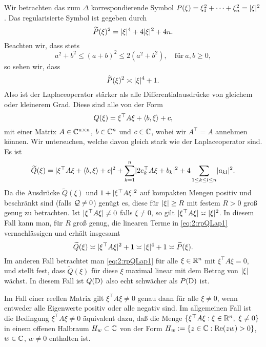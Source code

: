 \begin{exa}\label{exa:2:lap}
Wir betrachten das zum  $\Delta$
korrespondierende Symbol $P(\xi)=\xi_1^2+\dots+\xi_n^2=\lvert\xi\rvert^2$.
Das regularisierte Symbol ist gegeben durch
\begin{equation}
\widetilde{P}(\xi)^2=\lvert\xi\rvert^4+4\lvert\xi\rvert^2+4n.
\end{equation}
Beachten wir, dass stets
\begin{equation}\label{eq:2:sqrest}
a^2+b^2\leq(a+b)^2\leq2(a^2+b^2),\quad\text{für}~a,b\geq0,
\end{equation}
so sehen wir, dass
\begin{equation}
\widetilde{P}(\xi)^2\asymp\lvert\xi\rvert^4+1.
\end{equation}
Also ist der Laplaceoperator stärker als alle Differentialausdrücke von gleichem oder kleinerem Grad.
Diese sind alle von der Form
\begin{equation}
Q(\xi)=\xi^\top A\xi+\langle b,\xi\rangle+c,
\end{equation}
mit einer Matrix $A\in\mathbb C^{n\times n}$, $b\in\mathbb C^n$ und $c\in\mathbb C$,
wobei wir $A^\top=A$ annehmen können.
Wir untersuchen, welche davon gleich stark wie der Laplaceoperator sind.
Es ist
\begin{equation}\label{eq:2:rpQLap1}
\widetilde{Q}(\xi)=\lvert\xi^\top A\xi+\langle b,\xi\rangle+c\rvert^2+\sum_{k=1}^n\lvert2e^\top_kA\xi+b_k\rvert^2
+4\sum_{1\leq k\leq l\leq n}\lvert a_{kl}\rvert^2.
\end{equation}
Da die Ausdrücke $\widetilde{Q}(\xi)$ und $1+\lvert\xi^\top A\xi\rvert^2$
auf kompakten Mengen positiv und beschränkt sind (falls $\mathcal Q\neq0$) genügt es,
diese für $\lvert\xi\rvert\geq R$ mit festem $R>0$ groß genug zu betrachten.
Ist $\lvert\xi^\top A\xi\rvert\neq0$ falls $\xi\neq0$,
so gilt $\lvert\xi^\top A\xi\rvert\asymp\lvert\xi\rvert^2$.
In diesem Fall kann man, für $R$ groß genug,
die linearen Terme in \eqref{eq:2:rpQLap1} vernachlässigen
und erhält insgesamt
\begin{equation}
\widetilde{Q}(\xi)\asymp\lvert\xi^\top A\xi\rvert^2+1\asymp\lvert\xi\rvert^4+1\asymp\widetilde{P}(\xi).
\end{equation}
Im anderen Fall betrachtet man \eqref{eq:2:rpQLap1}
für alle $\xi\in\mathbb R^n$ mit $\xi^\top A\xi=0$,
und stellt fest, dass $\widetilde{Q}(\xi)$ für diese $\xi$
maximal linear mit dem Betrag von $\lvert\xi\rvert$ wächst.
In diesem Fall ist $Q(\mathrm D)$ also echt schwächer als $P(\mathrm D)$ ist.

Im Fall einer reellen Matrix gilt $\xi^\top A\xi\neq0$ genau dann für alle $\xi\neq0$,
wenn entweder alle Eigenwerte positiv oder alle negativ sind.
Im allgemeinen Fall ist die Bedingung $\xi^\top A\xi\neq0$
äquivalent dazu, daß die Menge $\{\xi^\top A\xi:\xi\in\mathbb R^n,~\xi\neq0\}$
in einem offenen Halbraum $H_w\subset\mathbb C$
von der Form $H_w:=\{z\in\mathbb C:\operatorname{Re}(zw)>0\}$, $w\in\mathbb C$, $w\neq0$ enthalten ist.
\end{exa}

